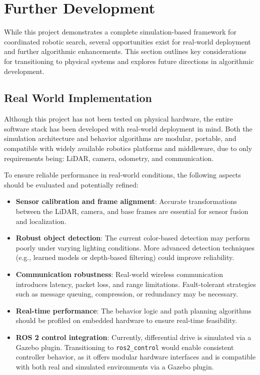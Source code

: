 \section{Further Development}
While this project demonstrates a complete simulation-based framework for coordinated robotic search, several opportunities exist for real-world deployment and further algorithmic enhancements. This section outlines key considerations for transitioning to physical systems and explores future directions in algorithmic development.

\subsection{Real World Implementation}
Although this project has not been tested on physical hardware, the entire software stack has been developed with real-world deployment in mind. Both the simulation architecture and behavior algorithms are modular, portable, and compatible with widely available robotics platforms and middleware, due to only requirements being: LiDAR, camera, odometry, and communication.

To ensure reliable performance in real-world conditions, the following aspects should be evaluated and potentially refined:

\begin{itemize}
  \item \textbf{Sensor calibration and frame alignment}: Accurate transformations between the LiDAR, camera, and base frames are essential for sensor fusion and localization.
  \item \textbf{Robust object detection}: The current color-based detection may perform poorly under varying lighting conditions. More advanced detection techniques (e.g., learned models or depth-based filtering) could improve reliability.
  \item \textbf{Communication robustness}: Real-world wireless communication introduces latency, packet loss, and range limitations. Fault-tolerant strategies such as message queuing, compression, or redundancy may be necessary.
  \item \textbf{Real-time performance}: The behavior logic and path planning algorithms should be profiled on embedded hardware to ensure real-time feasibility.
  \item \textbf{ROS 2 control integration}: Currently, differential drive is simulated via a Gazebo plugin. Transitioning to \texttt{ros2\_control} \cite{ros2-control} would enable consistent controller behavior, as it offers modular hardware interfaces and is compatible with both real and simulated environments via a Gazebo plugin.
\end{itemize}

